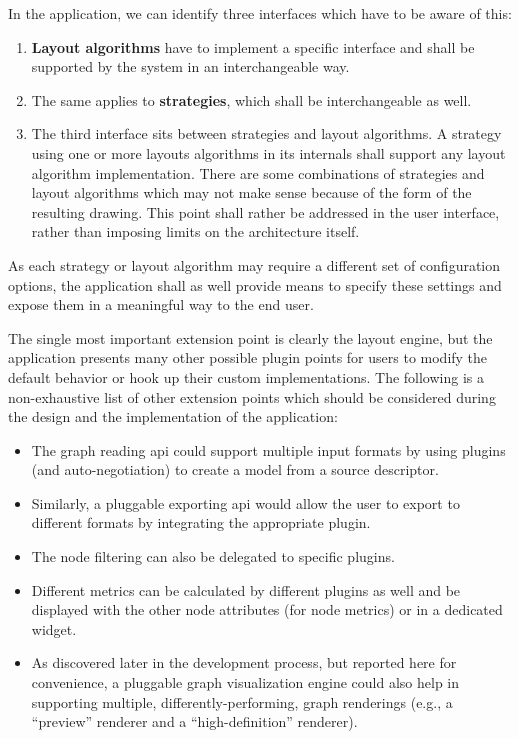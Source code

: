 In the application, we can identify three interfaces which have to be aware of this:
\begin{enumerate}
  \item \textbf{Layout algorithms} have to implement a specific interface and shall be supported by the system in an interchangeable way.
  \item The same applies to \textbf{strategies}, which shall be interchangeable as well.
  \item The third interface sits between strategies and layout algorithms. A strategy using one or more layouts algorithms in its internals shall support any layout algorithm implementation. There are some combinations of strategies and layout algorithms which may not make sense because of the form of the resulting drawing. This point shall rather be addressed in the user interface, rather than imposing limits on the architecture itself.
\end{enumerate}

As each strategy or layout algorithm may require a different set of configuration options, the application shall as well provide means to specify these settings and expose them in a meaningful way to the end user.

The single most important extension point is clearly the layout engine, but the application presents many other possible plugin points for users to modify the default behavior or hook up their custom implementations. The following is a non-exhaustive list of other extension points which should be considered during the design and the implementation of the application:

\begin{itemize}
  \item The graph reading \gls{api} could support multiple input formats by using plugins (and auto-negotiation) to create a model from a source descriptor.
  \item Similarly, a pluggable exporting \gls{api} would allow the user to export to different formats by integrating the appropriate plugin.
  \item The node filtering can also be delegated to specific plugins.
  \item Different metrics can be calculated by different plugins as well and be displayed with the other node attributes (for node metrics) or in a dedicated widget.
  \item As discovered later in the development process, but reported here for convenience, a pluggable graph visualization engine could also help in supporting multiple, differently-performing, graph renderings (e.g., a ``preview'' renderer and a ``high-definition'' renderer).
\end{itemize}

